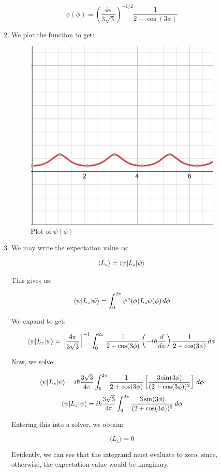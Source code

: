 \begin{enumerate}
\begin{enumerate}
        $$\boxed{\psi(\phi)=\left( \frac{4\pi}{3\sqrt{3}} \right)^{-1/2}\frac{1}{2+\cos(3\phi)}}$$

      \item We plot the function to get:

        \begin{figure}[H]
          \centering
          \includegraphics[width=.5\textwidth]{Figures/HW7-2b}
          \caption{Plot of $\psi(\phi)$}
          \label{fig:1}
        \end{figure}

      \item We may write the expectation value as:

        $$\langle L_z\rangle = \bra{\psi|L_z}\ket{\psi}$$

        This gives us:

        $$\bra{\psi|L_z}\ket{\psi}=\int_{0}^{2\pi} \psi^*(\phi) L_z\psi(\phi)\,d\phi$$

        We expand to get:

        $$\bra{\psi|L_z}\ket{\psi}=\left[\frac{4\pi}{3\sqrt{3}}\right]^{-1}\int_{0}^{2\pi}\frac{1}{2+\cos(3\phi)}\left( -i\hbar\frac{d}{d\phi} \right)\frac{1}{2+\cos(3\phi)} \,d\phi$$

        Now, we solve:

        $$\bra{\psi|L_z}\ket{\psi}=i\hbar\frac{ 3\sqrt{3}}{4\pi}\int_{0}^{2\pi}\frac{1}{2+\cos(3\phi)}\left[\frac{3\sin(3\phi)}{(2+\cos(3\phi))^2}\right] \,d\phi$$
        $$\bra{\psi|L_z}\ket{\psi}=i\hbar\frac{ 3\sqrt{3}}{4\pi}\int_{0}^{2\pi}\frac{3\sin(3\phi)}{(2+\cos(3\phi))^3} \,d\phi$$

        Entering this into a solver, we obtain:

        $$\boxed{\langle L_z\rangle=0}$$

        Evidently, we can see that the integrand must evaluate to zero, since, otherwise, the expectation value would be imaginary.


\end{enumerate}
\end{enumerate}
